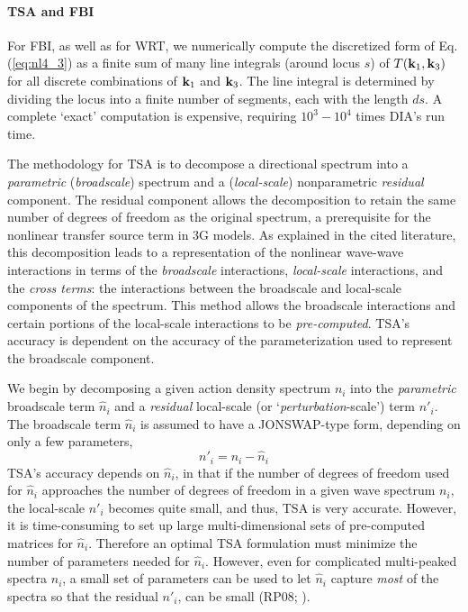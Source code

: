 \paragraph{TSA and FBI}

For FBI, as well as for WRT, we numerically compute the discretized form of Eq.(\ref{eq:nl4_3}) as a finite sum of many line integrals (around locus $s$) of $T({\bf k}_1,{\bf k}_3 )$ for all discrete  combinations of ${\bf k}_1$ and ${\bf k}_3$. The line integral is determined by dividing the locus into a finite number of segments, each with the length $ds$. A complete `exact' computation is expensive, requiring $10^3-10^4$ times DIA’s run time. 

The methodology for TSA is to decompose a directional spectrum into a \textit{parametric} (\textit{broadscale}) spectrum and a (\textit{local-scale}) nonparametric \textit{residual} component. The residual component allows the decomposition to retain the same number of degrees of freedom as the original spectrum, a prerequisite for the nonlinear transfer source term in 3G models. As explained in the cited literature, this decomposition leads to a representation of the nonlinear wave-wave interactions in terms of the \textit{broadscale} interactions, \textit{local-scale} interactions, and the \textit{cross terms}: the interactions between the broadscale and local-scale components of the spectrum. This method allows the broadscale interactions and certain portions of the local-scale interactions to be \textit{pre-computed}. TSA's accuracy is dependent on the accuracy of the parameterization used to represent the broadscale component.

We begin by decomposing a given action density spectrum $n_i$ into the \textit{parametric} broadscale term $\hat{n}_i$ and a \textit{residual} local-scale (or `\textit{perturbation}-scale') term $n'_i$. The broadscale term $\hat{n}_i$ is assumed to have a JONSWAP-type form, depending on only a few parameters, 
\begin{equation}
		n'_i=n_i-\hat{n}_i
\end{equation}			
TSA's accuracy depends on $\hat{n}_i$, in that if the number of degrees of freedom used for $\hat{n}_i$ approaches the number of degrees of freedom in a given wave spectrum $n_i$, the local-scale $n'_i$ becomes quite small, and thus, TSA is very accurate.  However, it is time-consuming to set up large multi-dimensional sets of pre-computed matrices for $\hat{n}_i$. Therefore an optimal TSA formulation must minimize the number of parameters needed for $\hat{n}_i$.  However, even for complicated multi-peaked spectra $n_i$, a small set of parameters can be used to let $\hat{n}_i$ capture \textit{most} of the spectra so that the residual $n'_i$, can be small (RP08; \cite{art:Perrie2009}). 
 
